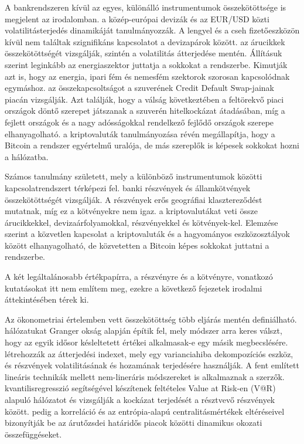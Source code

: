 \documentclass[12pt,bibliography=totoc]{article}
\begin{document}
A bankrendszeren kívül az egyes, különálló instrumentumok összekötöttsége is megjelent az irodalomban. \cite{bubak2011volatility} a közép-európai devizák és az EUR/USD közti volatilitásterjedés dinamikáját tanulmányozzák. A lengyel és a cseh fizetőeszközön kívül nem találtak szignifikáns kapcsolatot a devizapárok között.
\cite{diebold2017commodity} az árucikkek összekötöttségét vizsgálják, szintén a volatilitás átterjedése mentén. Állításuk szerint leginkább az energiaszektor juttatja a sokkokat a rendszerbe. Kimutják azt is, hogy az energia, ipari fém és nemesfém szektorok szorosan kapcsolódnak egymáshoz.
\cite{bostanci2020connected} az összekapcsoltságot a szuverének Credit Default Swap-jainak piacán vizsgálják. Azt találják, hogy a válság következtében a feltörekvő piaci országok döntő szerepet játszanak a szuverén hitelkockázat átadásában, míg a fejlett országok és a nagy adósságokkal rendelkező fejlődő országok szerepe elhanyagolható.
\cite{moratis2021quantifying} a kriptovaluták tanulmányozása révén megállapítja, hogy a Bitcoin a rendszer egyértelmű uralója, de más szereplők is képesek sokkokat hozni a hálózatba.

Számos tanulmány született, mely a különböző instrumentumok közötti kapcsolatrendszert térképezi fel. \cite{demirer2018estimating} banki részvények és államkötvények összekötöttségét vizsgálják. A részvények erős geográfiai klasztereződést mutatnak, míg ez a kötvényekre nem igaz. \cite{kurka2019cryptocurrencies} a kriptovalutákat veti össze árucikkekkel, devizaárfolyamokkal, részvényekkel és kötvények-kel. Elemzése szerint a közvetlen kapcsolat a kriptovaluták és a hagyományos eszközosztályok között elhanyagolható, de közvetetten a Bitcoin képes sokkokat juttatni a rendszerbe.

\medskip
A két legáltalánosabb értékpapírra, a részvényre és a kötvényre, vonatkozó kutatásokat itt nem említem meg, ezekre a következő fejezetek irodalmi áttekintésében térek ki.
\medskip

Az ökonometriai értelemben vett összekötöttség több eljárás mentén definiálható.  \cite{billio2012econometric} hálózatukat Granger okság alapján építik fel, mely módszer arra keres válszt, hogy az egyik idősor késleltetett értékei alkalmasak-e egy másik megbecslésére. \cite{diebold2009measuring} létrehozzák az átterjedési indexet, mely egy varianciahiba dekompozíciós eszköz, és részvények volatilitásának és hozamának terjedésére használják. A fent említett lineáris technikák mellett nem-lineráris módszereket is alkalmaznak a szerzők. \cite{hardle2016tenet} kvantilisregresszió segítségével készítenek feltételes Value at Risk-en (V@R) alapuló hálózatot és vizsgálják a kockázat terjedését a résztvevő részvények között. \cite{bekiros2017information} pedig a korreláció és az entrópia-alapú centralitásmértékek eltéréseivel bizonyítják be az árutőzsdei határidős piacok közötti dinamikus okozati összefüggéseket.
\end{document}
